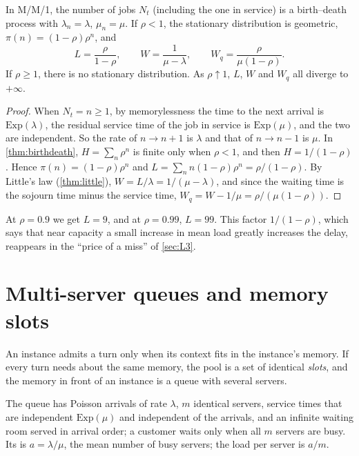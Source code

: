\begin{proposition}\label{prop:mm1}
In M/M/1, the number of jobs $N_t$ (including the one in service) is a birth--death
process with $\lambda_n=\lambda$, $\mu_n=\mu$. If $\rho<1$, the stationary
distribution is geometric, $\pi(n)=(1-\rho)\rho^n$, and
\[
  L=\frac{\rho}{1-\rho},\qquad W=\frac{1}{\mu-\lambda},\qquad W_q=\frac{\rho}{\mu(1-\rho)} .
\]
If $\rho\ge1$, there is no stationary distribution. As $\rho\uparrow1$, $L$, $W$ and
$W_q$ all diverge to $+\infty$.
\end{proposition}
\begin{proof}
When $N_t=n\ge1$, by memorylessness the time to the next arrival is $\mathrm{Exp}(\lambda)$,
the residual service time of the job in service is $\mathrm{Exp}(\mu)$, and the two are
independent. So the rate of $n\to n+1$ is $\lambda$ and that of $n\to n-1$ is $\mu$.
In \cref{thm:birthdeath}, $H=\sum_n\rho^n$ is finite only when $\rho<1$, and then
$H=1/(1-\rho)$. Hence $\pi(n)=(1-\rho)\rho^n$ and
$L=\sum_n n(1-\rho)\rho^n=\rho/(1-\rho)$. By Little's law (\cref{thm:little}),
$W=L/\lambda=1/(\mu-\lambda)$, and since the waiting time is the sojourn time minus the
service time, $W_q=W-1/\mu=\rho/(\mu(1-\rho))$.
\end{proof}

At $\rho=0.9$ we get $L=9$, and at $\rho=0.99$, $L=99$. This factor $1/(1-\rho)$, which
says that near capacity a small increase in mean load greatly increases the delay,
reappears in the ``price of a miss'' of \cref{sec:L3}.

\section{Multi-server queues and memory slots}\label{L2:sec:mmm}

An instance admits a turn only when its context fits in the instance's memory. If every
turn needs about the same memory, the pool is a set of identical \emph{slots}, and the
memory in front of an instance is a queue with several servers.

\begin{definition}[M/M/$m$ queue]\label{L2:def:mmm}
The  queue has Poisson arrivals of rate $\lambda$, $m$ identical servers,
service times that are independent $\mathrm{Exp}(\mu)$ and independent of the arrivals,
and an infinite waiting room served in arrival order; a customer waits only when all
$m$ servers are busy. Its  is $a=\lambda/\mu$, the mean number of
busy servers; the load per server is $a/m$.
\end{definition}

